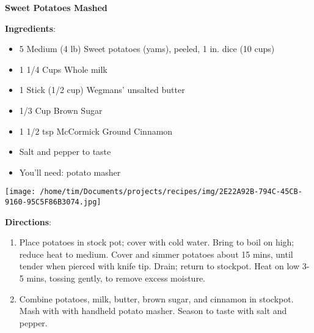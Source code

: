 \documentclass[11pt, twoside, openany]{book}
\begin{document}
\noindent\begin{minipage}[t]{\linewidth}%
{\Large\textbf{Sweet Potatoes Mashed}} \label{sweet-potatoes-mashed}\hfill\textit{}\\
\noindent\begin{minipage}[t]{0.78\linewidth}%
\textbf{Ingredients}:\vspace{-3mm}
\begin{multicols}{2}
\begin{itemize}\setlength\itemsep{-1mm}
\item 5 Medium (4 lb) Sweet potatoes (yams), peeled, 1 in. dice (10 cups)
\item 1 1/4 Cups Whole milk
\item 1 Stick (1/2 cup) Wegmans' unsalted butter
\item 1/3 Cup Brown Sugar
\item 1 1/2 tsp McCormick Ground Cinnamon
\item Salt and pepper to taste
\item You'll need: potato masher
\end{itemize}
\end{multicols}
\end{minipage}
\noindent\begin{minipage}[t]{0.18\linewidth}
\centering \strut\vspace*{-\baselineskip}\newline
\texttt{[image: /home/tim/Documents/projects/recipes/img/2E22A92B-794C-45CB-9160-95C5F86B3074.jpg]}\\
\end{minipage}\vspace{3mm}
\textbf{Directions}:
\vspace{-3mm}\begin{enumerate}\setlength\itemsep{-1mm}
\item Place potatoes in stock pot; cover with cold water. Bring to boil on high; reduce heat to medium. Cover and simmer potatoes about 15 mins, until tender when pierced with knife tip. Drain; return to stockpot. Heat on low 3-5 mins, tossing gently, to remove excess moisture.
\item Combine potatoes, milk, butter, brown sugar, and cinnamon in stockpot. Mash with with handheld potato masher. Season to taste with salt and pepper. 
\end{enumerate}
\end{minipage}\vspace{8mm}
\end{document}
